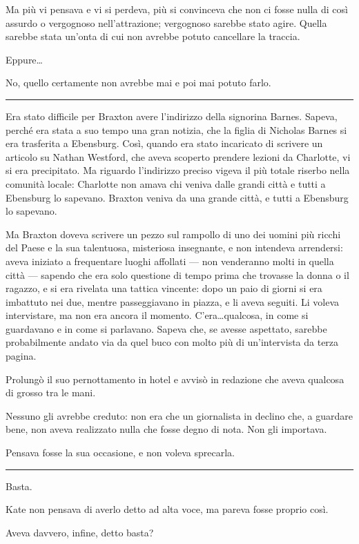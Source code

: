 \documentclass[a4paper,oneside,11pt]{memoir}
\begin{document}
Ma più vi pensava e vi si perdeva, più si convinceva che non ci fosse nulla di così assurdo o
vergognoso nell'attrazione; vergognoso sarebbe stato agire. Quella sarebbe stata un'onta di cui non
avrebbe potuto cancellare la traccia.

Eppure\dots

No, quello certamente non avrebbe mai e poi mai potuto farlo.

\plainbreak{1}

Era stato difficile per Braxton avere l'indirizzo della signorina Barnes. Sapeva, perché era stata a
suo tempo una gran notizia, che la figlia di Nicholas Barnes si era trasferita a Ebensburg. Così,
quando era stato incaricato di scrivere un articolo su Nathan Westford, che aveva scoperto prendere
lezioni da Charlotte, vi si era precipitato. Ma riguardo l'indirizzo preciso vigeva il più totale
riserbo nella comunità locale: Charlotte non amava chi veniva dalle grandi città e tutti a Ebensburg
lo sapevano. Braxton veniva da una grande città, e tutti a Ebensburg lo sapevano.

Ma Braxton doveva scrivere un pezzo sul rampollo di uno dei uomini più ricchi del Paese e la sua
talentuosa, misteriosa insegnante, e non intendeva arrendersi: aveva iniziato a frequentare luoghi
affollati — non venderanno molti in quella città — sapendo che era solo questione di tempo prima che
trovasse la donna o il ragazzo, e si era rivelata una tattica vincente: dopo un paio di giorni si
era imbattuto nei due, mentre passeggiavano in piazza, e li aveva seguiti. Li voleva intervistare,
ma non era ancora il momento. C'era\dots qualcosa, in come si guardavano e in come si parlavano.
Sapeva che, se avesse aspettato, sarebbe probabilmente andato via da quel buco con molto più di
un'intervista da terza pagina.

Prolungò il suo pernottamento in hotel e avvisò in redazione che aveva qualcosa di grosso tra le
mani.

Nessuno gli avrebbe creduto: non era che un giornalista in declino che, a guardare bene, non aveva
realizzato nulla che fosse degno di nota. Non gli importava.

Pensava fosse la sua occasione, e non voleva sprecarla.

\plainbreak{1}

Basta.

Kate non pensava di averlo detto ad alta voce, ma pareva fosse proprio così.

Aveva davvero, infine, detto basta?
\end{document}
